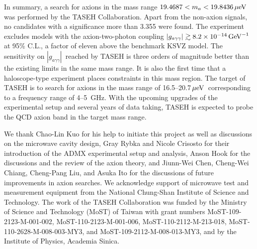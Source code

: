 \documentclass[%
 reprint,prl, %
superscriptaddress,
nobibnotes,
 amsmath,amssymb,
 aps,
]{revtex4-2}
\newcommand{\gagg}{\ensuremath{\left|g_{a\gamma\gamma}\right|}}
\newcommand{\ma}{\ensuremath{m_a}}
\newcommand{\muevcc}{\ensuremath{\,\mu\text{e\hspace{-.08em}V}}}
\newcommand{\GeVinv}{\ensuremath{\,\text{Ge\hspace{-.08em}V}^{-1}}}
\newcommand{\mlo}{\ensuremath{19.4687}}
\newcommand{\mhi}{\ensuremath{19.8436}}
\newcommand{\avelimit}{\ensuremath{8.2\times 10^{-14}}} %
\begin{document}
In summary, a search for axions in the mass 
range $\mlo < \ma < \mhi \muevcc$ was performed by the TASEH Collaboration.  
Apart from the non-axion signals, no candidates with a significance more than
3.355 were found. The experiment excludes models with the 
axion-two-photon coupling $\gagg\gtrsim \avelimit\GeVinv$ at 95\% C.L.,
 a factor of eleven 
above the benchmark KSVZ model. The sensitivity on \gagg\ reached by TASEH 
is three orders of magnitude better than the existing limits in the same 
mass range.  
It is also the first time that a haloscope-type experiment places 
constraints in this mass region. 
The target of TASEH is to search for axions in the mass range of 
16.5--20.7\muevcc\ corresponding to a frequency range of 4--5~GHz. 
With the upcoming upgrades of the experimental setup and several years of data 
taking, TASEH is expected to probe the QCD axion band in the target mass range.

\begin{acknowledgments}
We thank Chao-Lin Kuo for his help to initiate this project as well as
discussions on the microwave cavity design, Gray Rybka and Nicole Crisosto
for their introduction of the ADMX experimental
setup and analysis, Anson Hook for the discussions and the review of the
axion theory, and Jiunn-Wei Chen, Cheng-Wei Chiang, Cheng-Pang Liu, and
Asuka Ito for the discussions of future improvements in axion searches. 
We acknowledge support of microwave test and measurement equipment from the 
National Chung-Shan Institute of Science and Technology. 
  The work of the TASEH Collaboration was funded by
the Ministry of Science and Technology (MoST) of Taiwan with grant numbers
MoST-109-2123-M-001-002, MoST-110-2123-M-001-006, MoST-110-2112-M-213-018,
MoST-110-2628-M-008-003-MY3,
and MoST-109-2112-M-008-013-MY3, and by the Institute of Physics, Academia
Sinica.
\end{acknowledgments}

\end{document}

